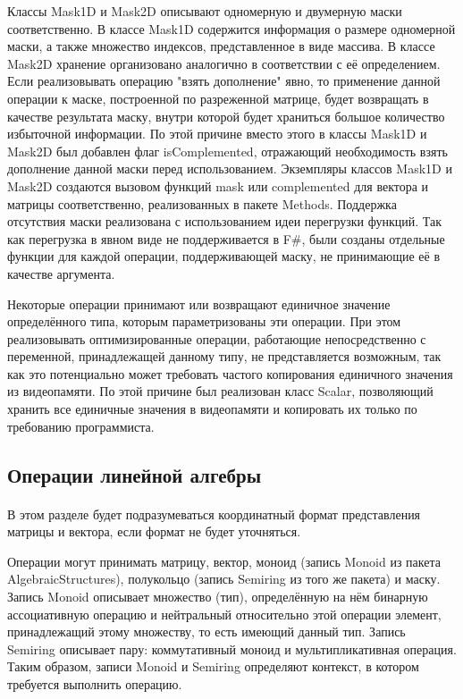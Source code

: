 \documentclass[14pt]{matmex-diploma-custom}
\begin{document}
Классы Mask1D и Mask2D описывают одномерную и двумерную маски соответственно. В классе Mask1D содержится информация о размере одномерной маски, а также множество индексов, представленное в виде массива. В классе Mask2D хранение организовано аналогично в соответствии с её определением. Если реализовывать операцию "взять дополнение" явно, то применение данной операции к маске, построенной по разреженной матрице, будет возвращать в качестве результата маску, внутри которой будет храниться большое количество избыточной информации. По этой причине вместо этого в классы Mask1D и Mask2D был добавлен флаг isComplemented, отражающий необходимость взять дополнение данной маски перед использованием. Экземпляры классов Mask1D и Mask2D создаются вызовом функций mask или complemented для вектора и матрицы соответственно, реализованных в пакете Methods. Поддержка отсутствия маски реализована с использованием идеи перегрузки функций. Так как перегрузка в явном виде не поддерживается в F\#, были созданы отдельные функции для каждой операции, поддерживающей маску, не принимающие её в качестве аргумента.

Некоторые операции принимают или возвращают единичное значение определённого типа, которым параметризованы эти операции. При этом реализовывать оптимизированные операции, работающие непосредственно с переменной, принадлежащей данному типу, не представляется возможным, так как это потенциально может требовать частого копирования единичного значения из видеопамяти. По этой причине был реализован класс Scalar, позволяющий хранить все единичные значения в видеопамяти и копировать их только по требованию программиста.

\subsection{Операции линейной алгебры}\label{LinearAlgebraOperations}
\paragraph{} В этом разделе будет подразумеваться координатный формат представления матрицы и вектора, если формат не будет уточняться.

Операции могут принимать матрицу, вектор, моноид (запись Monoid из пакета AlgebraicStructures), полукольцо (запись Semiring из того же пакета) и маску. Запись Monoid описывает множество (тип), определённую на нём бинарную ассоциативную операцию и нейтральный относительно этой операции элемент, принадлежащий этому множеству, то есть имеющий данный тип. Запись Semiring описывает пару: коммутативный моноид и мультипликативная операция. Таким образом, записи Monoid и Semiring определяют контекст, в котором требуется выполнить операцию.
\end{document}
